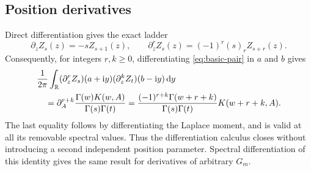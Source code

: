 \subsection{Position derivatives}
Direct differentiation gives the exact ladder
\begin{equation}\label{eq:Z-position-ladder}
 \partial_z Z_s(z)=-sZ_{s+1}(z),\qquad
 \partial_z^r Z_s(z)=(-1)^r(s)_r Z_{s+r}(z).
\end{equation}
Consequently, for integers $r,k\ge0$, differentiating
\eqref{eq:basic-pair} in $a$ and $b$ gives
\begin{align}
 &\frac1{2\pi}\int_{\mathbb R}
    (\partial_z^r Z_s)(a+\mathrm i y)(\partial_z^k Z_t)(b-\mathrm i y)\,\mathrm d y
       \notag\\
 &\quad=\partial_A^{r+k}
       \frac{\Gamma(w)K(w,A)}{\Gamma(s)\Gamma(t)}
   =\frac{(-1)^{r+k}\Gamma(w+r+k)}{\Gamma(s)\Gamma(t)}
                K(w+r+k,A).\label{eq:position-pair}
\end{align}
The last equality follows by differentiating the Laplace moment, and is
valid at all its removable spectral values. Thus the differentiation
calculus closes without introducing a second independent position
parameter. Spectral differentiation of this identity gives the same result
for derivatives of arbitrary $G_m$.

